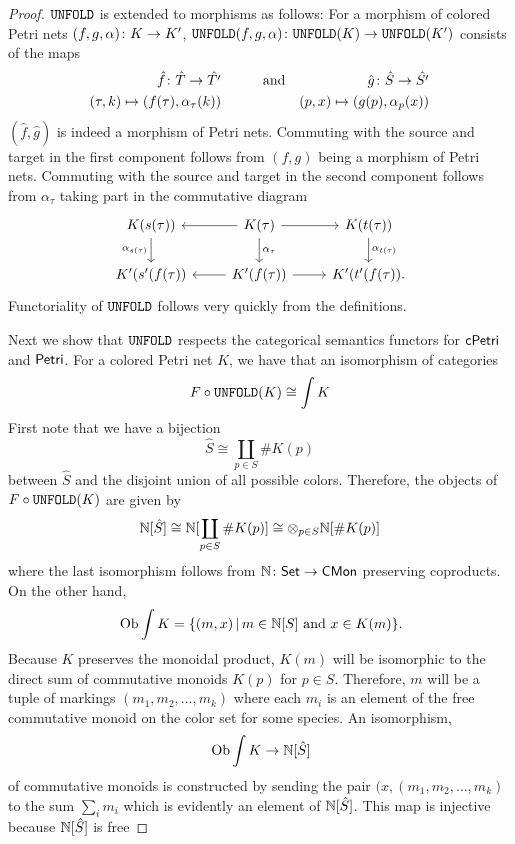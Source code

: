 \begin{proof}
$\mathtt{UNFOLD}$ is extended to morphisms as follows:
For a morphism of colored Petri nets $(f,g,\alpha) \colon K \to K'$, $\mathtt{UNFOLD}(f,g,\alpha) \colon \mathtt{UNFOLD}(K) \to \mathtt{UNFOLD}(K')$ consists of the maps
\begin{align*}
\hat{f}   \colon  \hat{T} \to \hat{T'} &\quad \quad\quad \text{and} &\hat{g}   \colon  \hat{S} \to \hat{S'}\\
      (\tau,k) \mapsto (f(\tau), \alpha_{\tau} (k) ) &  &(p,x) \mapsto (g(p), \alpha_{p} (x) )
\end{align*}
\noindent $(\hat{f},\hat{g})$ is indeed a morphism of Petri nets. Commuting with the source and target in the first component follows from $(f,g)$ being a morphism of Petri nets. Commuting with the source and target in the second component follows from $\alpha_\tau$ taking part in the commutative diagram
\[
\begin{tikzcd}
    K(s(\tau))
    \arrow[d, "\alpha_{s(\tau)}", swap]
    &
    K(\tau)
    \arrow[d, "\alpha_{\tau}"]
    \arrow[r]
    \arrow[l]
    &
    K(t(\tau))
    \arrow[d, "\alpha_{t(\tau)}"]
    \\
    K'(s'(f(\tau))
    &
    K'(f(\tau))
    \arrow[r]
    \arrow[l]
    &
    K'(t'(f(\tau)).
\end{tikzcd}
\]
Functoriality of $\mathtt{UNFOLD}$ follows very quickly from the definitions.

Next we show that $\mathtt{UNFOLD}$ respects the categorical semantics functors for $\mathsf{cPetri}$ and $\mathsf{Petri}$. For a colored Petri net $K$, we have that an isomorphism of categories
\[F \circ \mathtt{UNFOLD}(K) \cong \int K\]
First note that we have a bijection
\[\hat{S} \cong \coprod_{p \in S} \# K(p) \]
between $\hat{S}$ and the disjoint union of all possible colors. Therefore, the objects of $F \circ \mathtt{UNFOLD} (K)$ are given by
\[\mathbb{N}[\hat{S}] \cong \mathbb{N}[\coprod_{p \in S} \# K(p)] \cong \otimes_{p \in S} \mathbb{N}[ \# K(p) ]  \]
where the last isomorphism follows from $\mathbb{N} \colon \mathsf{Set} \to \mathsf{CMon}$ preserving coproducts. On the other hand,
\[\:\mathrm{Ob} \int K = \{(m,x) \, | \, m \in \mathbb{N}[S] \text{ and } x \in K(m) \}. \]
Because $K$ preserves the monoidal product, $K(m)$ will be isomorphic to the direct sum of commutative monoids $K(p)$ for $p \in S$. Therefore, $m$ will be a tuple of markings $(m_1, m_2, \ldots, m_k)$ where each $m_i$ is an element of the free commutative monoid on the color set for some species. An isomorphism, \[\:\mathrm{Ob} \int K \to \mathbb{N}[\hat{S}]\]
of commutative monoids is constructed by sending the pair $(x,(m_1,m_2,\ldots,m_k)$ to the sum $\sum_{i} m_i$ which is evidently an element of $\mathbb{N}[\hat{S}]$. This map is injective because $\mathbb{N}[\hat{S}]$ is free
\end{proof}

